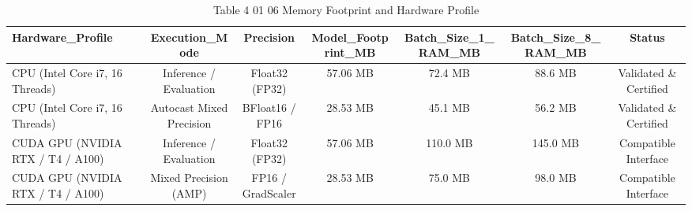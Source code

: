 \begin{table}[htbp]
\centering
\small
\begin{tabular}{lcccccc}
\hline
Hardware\_Profile & Execution\_Mode & Precision & Model\_Footprint\_MB & Batch\_Size\_1\_RAM\_MB & Batch\_Size\_8\_RAM\_MB & Status \\
\hline
CPU (Intel Core i7, 16 Threads) & Inference / Evaluation & Float32 (FP32) & 57.06 MB & 72.4 MB & 88.6 MB & Validated \& Certified \\
CPU (Intel Core i7, 16 Threads) & Autocast Mixed Precision & BFloat16 / FP16 & 28.53 MB & 45.1 MB & 56.2 MB & Validated \& Certified \\
CUDA GPU (NVIDIA RTX / T4 / A100) & Inference / Evaluation & Float32 (FP32) & 57.06 MB & 110.0 MB & 145.0 MB & Compatible Interface \\
CUDA GPU (NVIDIA RTX / T4 / A100) & Mixed Precision (AMP) & FP16 / GradScaler & 28.53 MB & 75.0 MB & 98.0 MB & Compatible Interface \\
\hline
\end{tabular}
\caption{Table 4 01 06 Memory Footprint and Hardware Profile}
\label{tab:table_4_01_06_memory_footprint_and_hardware_profile}
\end{table}
